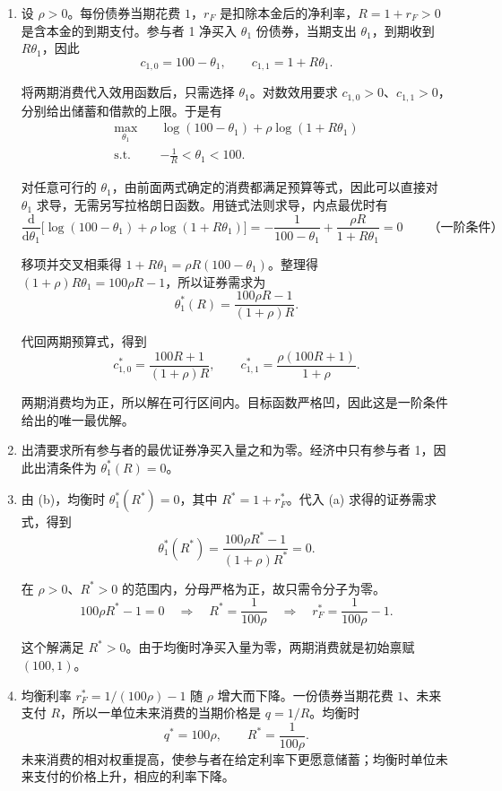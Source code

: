 \begin{solution}[blank-type=manual,blank-vsep=9\baselineskip]
\begin{enumerate}[label=(\alph*),ref=(\alph*)]
    \item\label{prob:wj-three-2-answer-a} 设 $\rho>0$。每份债券当期花费 $1$，$r_F$ 是扣除本金后的净利率，$R=1+r_F>0$ 是含本金的到期支付。参与者 1 净买入 $\theta_1$ 份债券，当期支出 $\theta_1$，到期收到 $R\theta_1$，因此
    \[
        c_{1,0}=100-\theta_1,\qquad c_{1,1}=1+R\theta_1.
    \]

    将两期消费代入效用函数后，只需选择 $\theta_1$。对数效用要求 $c_{1,0}>0$、$c_{1,1}>0$，分别给出储蓄和借款的上限。于是有
    \[
        \begin{aligned}
            \max_{\theta_1}\quad &\log(100-\theta_1)+\rho\log(1+R\theta_1)\\
            \text{s.t.}\quad &-\frac{1}{R}<\theta_1<100.
        \end{aligned}
    \]

    对任意可行的 $\theta_1$，由前面两式确定的消费都满足预算等式，因此可以直接对 $\theta_1$ 求导，无需另写拉格朗日函数。用链式法则求导，内点最优时有
    \[
        \frac{\mathrm d}{\mathrm d\theta_1}
        \bigl[\log(100-\theta_1)+\rho\log(1+R\theta_1)\bigr]
        =-\frac{1}{100-\theta_1}+\frac{\rho R}{1+R\theta_1}
        =0\qquad\text{（一阶条件）}
    \]

    移项并交叉相乘得 $1+R\theta_1=\rho R(100-\theta_1)$。整理得 $(1+\rho)R\theta_1=100\rho R-1$，所以证券需求为
    \[
        \theta_1^{*}(R)=\frac{100\rho R-1}{(1+\rho)R}.
    \]

    代回两期预算式，得到
    \[
        c_{1,0}^{*}=\frac{100R+1}{(1+\rho)R},\qquad
        c_{1,1}^{*}=\frac{\rho(100R+1)}{1+\rho}.
    \]

    两期消费均为正，所以解在可行区间内。目标函数严格凹，因此这是一阶条件给出的唯一最优解。
    \item 出清要求所有参与者的最优证券净买入量之和为零。经济中只有参与者 1，因此出清条件为 $\theta_1^{*}(R)=0$。
    \item\label{prob:wj-three-2-answer-c} 由 (b)，均衡时 $\theta_1^*(R^*)=0$，其中 $R^*=1+r_F^*$。代入 (a) 求得的证券需求式，得到
    \[
        \theta_1^{*}(R^*)=\frac{100\rho R^*-1}{(1+\rho)R^*}=0.
    \]

    在 $\rho>0$、$R^*>0$ 的范围内，分母严格为正，故只需令分子为零。
    \[
        100\rho R^*-1=0
        \quad\Longrightarrow\quad R^*=\frac{1}{100\rho}
        \quad\Longrightarrow\quad r_F^{*}=\frac{1}{100\rho}-1.
    \]

    这个解满足 $R^*>0$。由于均衡时净买入量为零，两期消费就是初始禀赋 $(100,1)$。
    \item 均衡利率 $r_F^{*}=1/(100\rho)-1$ 随 $\rho$ 增大而下降。一份债券当期花费 $1$、未来支付 $R$，所以一单位未来消费的当期价格是 $q=1/R$。均衡时
    \[
      q^{*}=100\rho,\qquad R^{*}=\frac1{100\rho}.
    \]
    未来消费的相对权重提高，使参与者在给定利率下更愿意储蓄；均衡时单位未来支付的价格上升，相应的利率下降。
\end{enumerate}
\end{solution}

